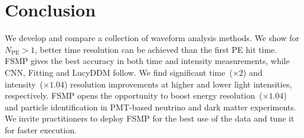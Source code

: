 \section{Conclusion}
\label{sec:conclusion}

We develop and compare a collection of waveform analysis methods.  We show for $N_\mathrm{PE} > 1$, better time resolution can be achieved than the first PE hit time.  FSMP gives the best accuracy in both time and intensity measurements, while CNN, Fitting and LucyDDM follow.  We find significant time~($\times 2$) and intensity~($\times 1.04$) resolution improvements at higher and lower light intensities, respectively.    FSMP opens the opportunity to boost energy resolution~($\times 1.04$) and particle identification in PMT-based neutrino and dark matter experiments.  We invite practitioners to deploy FSMP for the best use of the data and tune it for faster execution.
